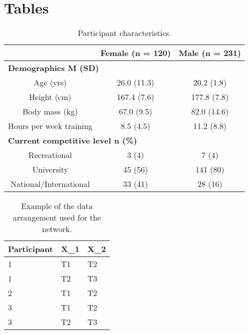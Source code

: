 \documentclass[
]{frontiersHLTH}
\begin{document}
\hypertarget{tables}{%
\section{Tables}\label{tables}}

\begin{table}[H]

\caption{\label{tab:table1}Participant characteristics.}
\centering
\begin{tabular}[t]{c|c|c}
\hline
\textbf{ } & \textbf{Female (n = 120)} & \textbf{Male (n = 231)}\\
\hline
\multicolumn{3}{l}{\textbf{Demographics M (SD)}}\\
\hline
\hspace{1em}Age (yrs) & 26.0 (11.3) & 20.2 (1.8)\\
\hline
\hspace{1em}Height (cm) & 167.4 (7.6) & 177.8 (7.8)\\
\hline
\hspace{1em}Body mass (kg) & 67.0 (9.5) & 82.0 (14.6)\\
\hline
\hspace{1em}Hours per week training & 8.5 (4.5) & 11.2 (8.8)\\
\hline
\multicolumn{3}{l}{\textbf{Current competitive level n (\%)}}\\
\hline
\hspace{1em}Recreational & 3 (4) & 7 (4)\\
\hline
\hspace{1em}University & 45 (56) & 141 (80)\\
\hline
\hspace{1em}National/International & 33 (41) & 28 (16)\\
\hline
\end{tabular}
\end{table}

\begin{table}[H]

\caption{\label{tab:table2}Example of the data arrangement used for the network.}
\centering
\begin{tabular}[t]{l|l|l}
\hline
\textbf{Participant} & \textbf{X\_1} & \textbf{X\_2}\\
\hline
1 & T1 & T2\\
\hline
1 & T2 & T3\\
\hline
2 & T1 & T2\\
\hline
3 & T1 & T2\\
\hline
3 & T2 & T3\\
\hline
\end{tabular}
\end{table}
\end{document}
